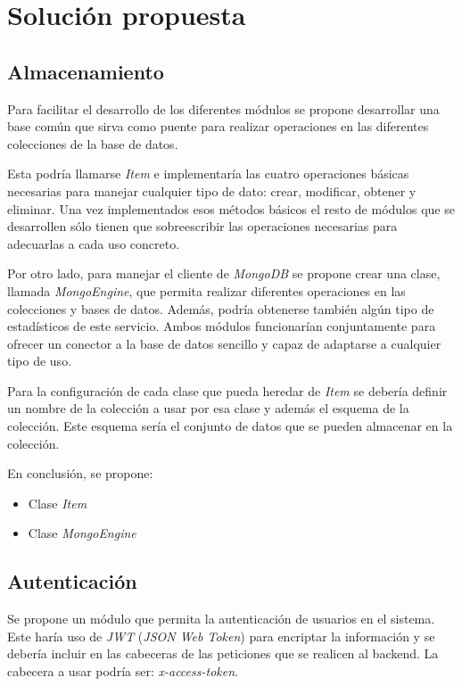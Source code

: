 \chapter{Solución propuesta}


\section{Almacenamiento}

Para facilitar el desarrollo de los diferentes módulos se propone desarrollar una base común que sirva como puente para realizar operaciones en las diferentes colecciones de la base de datos.

Esta podría llamarse \textit{Item} e implementaría las cuatro operaciones básicas necesarias para manejar cualquier tipo de dato: crear, modificar, obtener y eliminar. Una vez implementados esos métodos básicos el resto de módulos que se desarrollen sólo tienen que sobreescribir las operaciones necesarias para adecuarlas a cada uso concreto.

Por otro lado, para manejar el cliente de \textit{MongoDB} se propone crear una clase, llamada \textit{MongoEngine}, que permita realizar diferentes operaciones en las colecciones y bases de datos. Además, podría obtenerse también algún tipo de estadísticos de este servicio. Ambos módulos funcionarían conjuntamente para ofrecer un conector a la base de datos sencillo y capaz de adaptarse a cualquier tipo de uso.

Para la configuración de cada clase que pueda heredar de \textit{Item} se debería definir un nombre de la colección a usar por esa clase y además el esquema de la colección. Este esquema sería el conjunto de datos que se pueden almacenar en la colección.


\bigskip
En conclusión, se propone:
\begin{itemize}
	\item Clase \textit{Item}
	\item Clase \textit{MongoEngine}
\end{itemize}


\section{Autenticación}

Se propone un módulo que permita la autenticación de usuarios en el sistema. Este haría uso de \textit{JWT} (\textit{JSON Web Token}) para encriptar la información y se debería incluir en las cabeceras de las peticiones que se realicen al backend. La cabecera a usar podría ser: \textit{x-access-token}.

